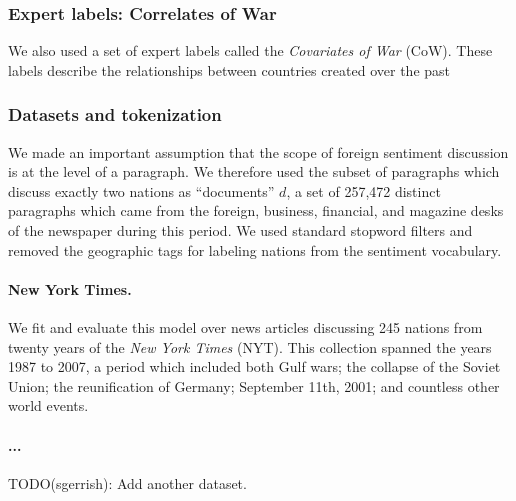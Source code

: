 \subsubsection{Expert labels: Correlates of War}
\label{section:correlates_of_war}

We also used a set of expert labels called the \emph{Covariates of
  War} (CoW).  These labels describe the relationships between
countries created over the past

\subsubsection{Datasets and tokenization}  We made an important
assumption that the scope of foreign sentiment discussion is at the
level of a paragraph.  We therefore used the subset of paragraphs
which discuss exactly two nations as ``documents'' $d$, a set of
257,472 distinct paragraphs which came from the foreign, business,
financial, and magazine desks of the newspaper during this period. We
used standard stopword filters and removed the geographic tags for
labeling nations from the sentiment vocabulary.

\label{section:experiments}

\paragraph{New York Times.} We fit and evaluate this model over news articles discussing 245
nations from twenty years of the \emph{New York Times} (NYT).  This
collection spanned the years 1987 to 2007, a period which included
both Gulf wars; the collapse of the Soviet Union; the reunification of
Germany; September 11th, 2001; and countless other world events.

\paragraph{...}
TODO(sgerrish): Add another dataset.
  
